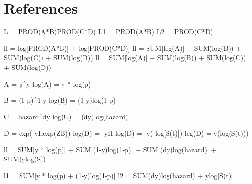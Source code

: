 \newpage
\section{References}




\begin{comment} %
# Structural factors that enable self-enforcing agreements
# Factors that result in changes to self-enforcing agreements

\begin{comment}
Table \ref{tab_sim_60_10_haz} presents the estimated hazard coefficients ($\beta_i$) for each of the models run. 
\begin{table}
\caption{Average Estimates of Hazard Coefficients for Simulated Datasets}
\label{tab_sim_60_10_haz}

\end{table}

\begin{table}
\caption{Average Estimates of Latency Coefficients for Simulated Datasets}
\label{tab_sim_60_10_lat}

\end{table}
\end{comment}



L = PROD(A*B)PROD(C*D)
L1 = PROD(A*B)
L2 = PROD(C*D)

ll = log[PROD(A*B)] + log[PROD(C*D)]
ll = {SUM[log(A)] + SUM(log(B))} + {SUM(log(C)) + SUM(log(D))}
ll = SUM[log(A)] + SUM(log(B)) + SUM(log(C)) + SUM(log(D))

A = p^y
log(A) = y * log(p)

B = (1-p)^{1-y}
log(B) = (1-y)log(1-p)

C = {hazard}^dy
log(C) = (dy)log(hazard)

D = exp(-yHexp(ZB))
log(D) = -yH
log(D) = -y(-log[S(t)])
log(D) = y(log(S(t)))

ll = SUM[y * log(p)] + SUM[(1-y)log(1-p)] + SUM[(dy)log(hazard)] + SUM(ylog(S))

l1 = SUM[y * log(p) + (1-y)log(1-p)]
l2 = SUM{(dy)log(hazard) + ylog[S(t)]} %

